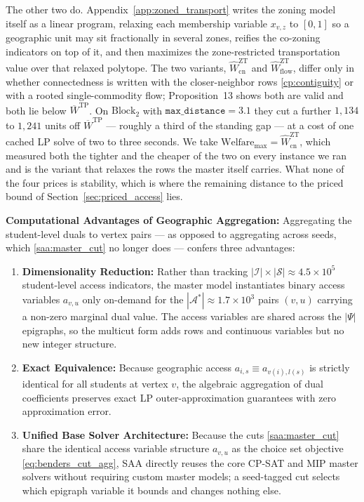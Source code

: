 \documentclass{article}
\begin{document}
The other two do. Appendix~\ref{app:zoned_transport} writes the zoning model itself as a linear program, relaxing each membership variable $x_{v,z}$ to $[0,1]$ so a geographic unit may sit fractionally in several zones, reifies the co-zoning indicators on top of it, and then maximizes the zone-restricted transportation value over that relaxed polytope. The two variants, $\widehat{W}^{\mathrm{ZT}}_{\mathrm{cn}}$ and $\widehat{W}^{\mathrm{ZT}}_{\mathrm{flow}}$, differ only in whether connectedness is written with the closer-neighbor rows \eqref{cp:contiguity} or with a rooted single-commodity flow; Proposition~13 shows both are valid and both lie below $\overline{W}^{\mathrm{TP}}$. On $\text{Block}_2$ with $\texttt{max\_distance} = 3.1$ they cut a further $1{,}134$ to $1{,}241$ units off $\overline{W}^{\mathrm{TP}}$ --- roughly a third of the standing gap --- at a cost of one cached LP solve of two to three seconds. We take $\text{Welfare}_{\max} = \widehat{W}^{\mathrm{ZT}}_{\mathrm{cn}}$, which measured both the tighter and the cheaper of the two on every instance we ran and is the variant that relaxes the rows the master itself carries. What none of the four prices is stability, which is where the remaining distance to the priced bound of Section~\ref{sec:priced_access} lies.

\noindent\textbf{Computational Advantages of Geographic Aggregation:}
Aggregating the student-level duals to vertex pairs --- as opposed to aggregating across seeds, which \eqref{saa:master_cut} no longer does --- confers three advantages:
\begin{enumerate}
    \item \textbf{Dimensionality Reduction:} Rather than tracking $|\mathcal{I}| \times |\mathcal{S}| \approx 4.5 \times 10^5$ student-level access indicators, the master model instantiates binary access variables $a_{v, u}$ only on-demand for the $|\mathcal{A}^*| \approx 1.7 \times 10^3$ pairs $(v, u)$ carrying a non-zero marginal dual value. The access variables are shared across the $|\Psi|$ epigraphs, so the multicut form adds rows and continuous variables but no new integer structure.
    \item \textbf{Exact Equivalence:} Because geographic access $a_{i,s} \equiv a_{v(i), l(s)}$ is strictly identical for all students at vertex $v$, the algebraic aggregation of dual coefficients preserves exact LP outer-approximation guarantees with zero approximation error.
    \item \textbf{Unified Base Solver Architecture:} Because the cuts \eqref{saa:master_cut} share the identical access variable structure $a_{v, u}$ as the choice set objective \eqref{eq:benders_cut_agg}, SAA directly reuses the core CP-SAT and MIP master solvers without requiring custom master models; a seed-tagged cut selects which epigraph variable it bounds and changes nothing else.
\end{enumerate}
\end{document}
